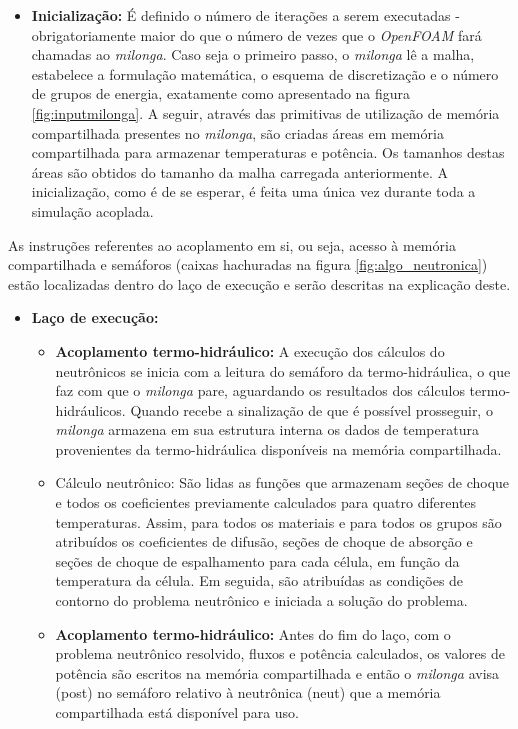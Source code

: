 \begin{itemize}
\item \textbf{Inicialização:} É definido o número de iterações a serem executadas - obrigatoriamente maior do que o número
  de vezes que o \textit{OpenFOAM} fará chamadas ao \textit{milonga}. Caso seja o primeiro passo, o \textit{milonga}
  lê a malha, estabelece a formulação matemática, o esquema de discretização e o número de grupos de energia, exatamente
  como apresentado na figura \ref{fig:inputmilonga}. A seguir, através das primitivas de utilização de memória compartilhada
  presentes no \textit{milonga}, são criadas áreas em memória compartilhada para armazenar temperaturas e potência. Os tamanhos
  destas áreas são obtidos do tamanho da malha carregada anteriormente. A inicialização, como é de se esperar, é feita uma única
  vez durante toda a simulação acoplada.
\end{itemize}

As instruções referentes ao acoplamento em si, ou seja, acesso à memória compartilhada e semáforos
(caixas hachuradas na figura \ref{fig:algo_neutronica}) estão localizadas dentro do laço de execução e serão
descritas na explicação deste.

\begin{itemize}
\item \textbf{Laço de execução:}

\begin{itemize}
\item \textbf{Acoplamento termo-hidráulico:} A execução dos cálculos do neutrônicos se inicia com a leitura do semáforo da
  termo-hidráulica, o que faz com que o \textit{milonga} pare, aguardando os resultados dos cálculos termo-hidráulicos.
  Quando recebe a sinalização de que é possível prosseguir, o \textit{milonga} armazena em sua estrutura interna os dados
  de temperatura provenientes da termo-hidráulica disponíveis na memória compartilhada.
\item Cálculo neutrônico: São lidas as funções que armazenam seções de choque e todos os coeficientes previamente calculados para quatro
  diferentes temperaturas. Assim, para todos os materiais e para todos os grupos são atribuídos os coeficientes de difusão,
  seções de choque de absorção e seções de choque de espalhamento para cada célula, em função da temperatura da célula.
  Em seguida, são atribuídas as condições de contorno do problema neutrônico e iniciada a solução do problema.
\item \textbf{Acoplamento termo-hidráulico:} Antes do fim do laço, com o problema neutrônico resolvido, fluxos e potência
  calculados, os valores de potência são escritos na memória compartilhada e então o \textit{milonga} avisa (post) no
  semáforo relativo à neutrônica (neut) que a memória compartilhada está disponível para uso.

\end{itemize}
\end{itemize}

